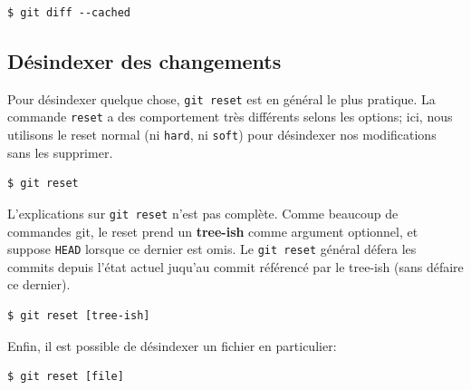 \documentclass{../../common/tufte-latex/tufte-handout}
\begin{document}
\begin{lstlisting}[style=BashInputStyle]
  $ git diff --cached
\end{lstlisting}

\subsection{Désindexer des changements}

Pour désindexer quelque chose, \texttt{git reset} est en général le plus pratique. 
La commande \texttt{reset} a des comportement très différents selons les options; ici, nous utilisons le reset normal (ni \texttt{hard}, ni \texttt{soft}) pour désindexer nos modifications sans les supprimer.


\begin{lstlisting}[style=BashInputStyle]
  $ git reset 
\end{lstlisting}

L'explications sur \texttt{git reset} n'est pas complète.
Comme beaucoup de commandes git, le reset prend un \textbf{tree-ish} comme argument optionnel, et suppose \texttt{HEAD} lorsque ce dernier est omis.
Le \texttt{git reset} général défera les commits depuis l'état actuel juqu'au commit référencé par le tree-ish (sans défaire ce dernier).

\begin{lstlisting}[style=BashInputStyle]
  $ git reset [tree-ish]
\end{lstlisting}

Enfin, il est possible de désindexer un fichier en particulier:

\begin{lstlisting}[style=BashInputStyle]
  $ git reset [file]
\end{lstlisting}
\end{document}
